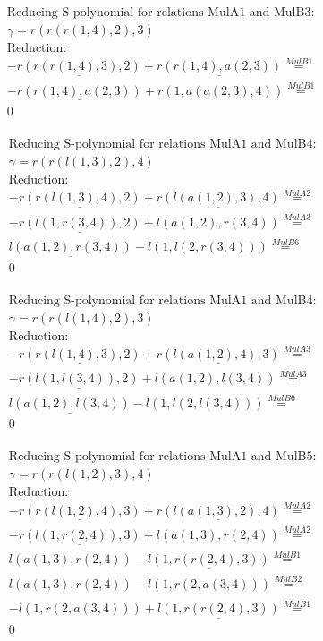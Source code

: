 \documentclass[11pt]{amsart}
\begin{document}
\begin{align*} 
& \text{Reducing S-polynomial for relations MulA1 and MulB3:} \\ 
& \gamma = r(r(r(1,4),2),3) \\ 
& \text{Reduction}: \\& - \underline{r(r(r(1,4),3),2)} + \underline{r(r(1,4),a(2,3))} \stackrel{ MulB1 }{=}  \\ 
& - \underline{r(r(1,4),a(2,3))} + r(1,a(a(2,3),4)) \stackrel{ MulB1 }{=}  \\ 
&0\\ 
\end{align*} 
 
\begin{align*} 
& \text{Reducing S-polynomial for relations MulA1 and MulB4:} \\ 
& \gamma = r(r(l(1,3),2),4) \\ 
& \text{Reduction}: \\& - \underline{r(r(l(1,3),4),2)} + \underline{r(l(a(1,2),3),4)} \stackrel{ MulA2 }{=}  \\ 
& - \underline{r(l(1,r(3,4)),2)} + l(a(1,2),r(3,4)) \stackrel{ MulA3 }{=}  \\ 
&\underline{l(a(1,2),r(3,4))} - l(1,l(2,r(3,4))) \stackrel{ MulB6 }{=}  \\ 
&0\\ 
\end{align*} 
 
\begin{align*} 
& \text{Reducing S-polynomial for relations MulA1 and MulB4:} \\ 
& \gamma = r(r(l(1,4),2),3) \\ 
& \text{Reduction}: \\& - \underline{r(r(l(1,4),3),2)} + \underline{r(l(a(1,2),4),3)} \stackrel{ MulA3 }{=}  \\ 
& - \underline{r(l(1,l(3,4)),2)} + l(a(1,2),l(3,4)) \stackrel{ MulA3 }{=}  \\ 
&\underline{l(a(1,2),l(3,4))} - l(1,l(2,l(3,4))) \stackrel{ MulB6 }{=}  \\ 
&0\\ 
\end{align*} 
 
\begin{align*} 
& \text{Reducing S-polynomial for relations MulA1 and MulB5:} \\ 
& \gamma = r(r(l(1,2),3),4) \\ 
& \text{Reduction}: \\& - \underline{r(r(l(1,2),4),3)} + \underline{r(l(a(1,3),2),4)} \stackrel{ MulA2 }{=}  \\ 
& - \underline{r(l(1,r(2,4)),3)} + l(a(1,3),r(2,4)) \stackrel{ MulA2 }{=}  \\ 
&l(a(1,3),r(2,4)) - \underline{l(1,r(r(2,4),3))} \stackrel{ MulB1 }{=}  \\ 
&\underline{l(a(1,3),r(2,4))} - l(1,r(2,a(3,4))) \stackrel{ MulB2 }{=}  \\ 
& - l(1,r(2,a(3,4))) + \underline{l(1,r(r(2,4),3))} \stackrel{ MulB1 }{=}  \\ 
&0\\ 
\end{align*} 
 
\end{document}
